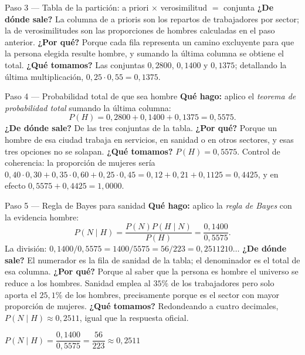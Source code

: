 \documentclass[11pt]{article}
\begin{document}
\begin{sol}
\begin{paso}{Paso 3 --- Tabla de la partición: a priori $\times$ verosimilitud $=$ conjunta}
\textbf{¿De dónde sale?} La columna de a prioris son los repartos de trabajadores por sector; la de verosimilitudes son las proporciones de hombres calculadas en el paso anterior.
\textbf{¿Por qué?} Porque cada fila representa un camino excluyente para que la persona elegida resulte hombre, y sumando la última columna se obtiene el total.
\textbf{¿Qué tomamos?} Las conjuntas $0,2800$, $0,1400$ y $0,1375$; detallando la última multiplicación, $0,25\cdot 0,55=0,1375$.
\end{paso}

\begin{paso}{Paso 4 --- Probabilidad total de que sea hombre}
\textbf{Qué hago:} aplico el \emph{teorema de probabilidad total} sumando la última columna:
\[
P(H)=0,2800+0,1400+0,1375=0,5575.
\]
\textbf{¿De dónde sale?} De las tres conjuntas de la tabla.
\textbf{¿Por qué?} Porque un hombre de esa ciudad trabaja en servicios, en sanidad o en otros sectores, y esas tres opciones no se solapan.
\textbf{¿Qué tomamos?} $P(H)=0,5575$. Control de coherencia: la proporción de mujeres sería $0,40\cdot 0,30+0,35\cdot 0,60+0,25\cdot 0,45=0,12+0,21+0,1125=0,4425$, y en efecto $0,5575+0,4425=1,0000$.
\end{paso}

\begin{paso}{Paso 5 --- Regla de Bayes para sanidad}
\textbf{Qué hago:} aplico la \emph{regla de Bayes} con la evidencia hombre:
\[
P(N\mid H)=\frac{P(N)P(H\mid N)}{P(H)}=\frac{0,1400}{0,5575}.
\]
La división: $0,1400/0,5575=1400/5575=56/223=0,2511210\ldots$
\textbf{¿De dónde sale?} El numerador es la fila de sanidad de la tabla; el denominador es el total de esa columna.
\textbf{¿Por qué?} Porque al saber que la persona es hombre el universo se reduce a los hombres. Sanidad emplea al $35\%$ de los trabajadores pero solo aporta el $25,1\%$ de los hombres, precisamente porque es el sector con mayor proporción de mujeres.
\textbf{¿Qué tomamos?} Redondeando a cuatro decimales, $P(N\mid H)\approx 0,2511$, igual que la respuesta oficial.
\end{paso}

\begin{resp}
$P(N\mid H)=\dfrac{0,1400}{0,5575}=\dfrac{56}{223}\approx 0,2511$
\end{resp}

\end{sol}
\end{document}
